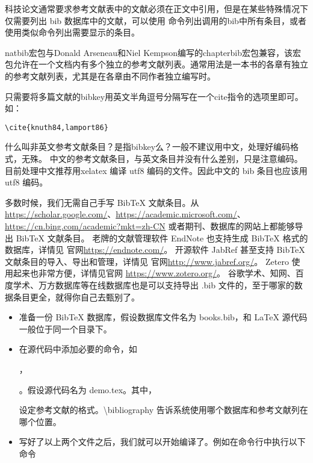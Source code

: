 科技论文通常要求参考文献表中的文献必须在正文中引用，但是在某些特殊情况下仅需要列出
bib 数据库中的文献，可以使用 \nocite{*}
命令列出调用的bib中所有条目，或者使用类似\nocite{ref1,ref2,ref3}命令列出需要显示的条目。







natbib宏包与Donald Arseneau和Niel
Kempson编写的chapterbib宏包兼容，该宏包允许在一个文档内有多个独立的参考文献列表。通常用法是一本书的各章有独立的参考文献列表，尤其是在各章由不同作者独立编写时。



只需要将多篇文献的bibkey用英文半角逗号分隔写在一个cite指令的选项里即可。如：

\begin{verbatim}
\cite{knuth84,lamport86}
\end{verbatim}



什么叫非英文参考文献条目？是指bibkey么？一般不建议用中文，处理好编码格式，无殊。
中文的参考文献条目，与英文条目并没有什么差别，只是注意编码。目前处理中文推荐用xelatex
编译 utf8 编码的文件。因此中文的 bib 条目也应该用 utf8 编码。



多数时候，我们无需自己手写 BibTeX 文献条目。从
\url{https://scholar.google.com/}、\url{https://academic.microsoft.com/}、
\url{https://cn.bing.com/academic?mkt=zh-CN}
或者期刊、数据库的网站上都能够导出 BibTeX 文献条目。 老牌的文献管理软件
EndNote 也支持生成 BibTeX 格式的数据库，详情见
官网\url{https://endnote.com/}。 开源软件 JabRef 甚至支持 BibTeX
文献条目的导入、导出和管理，详情见 官网\url{http://www.jabref.org/}。
Zetero 使用起来也非常方便，详情见官网 \url{https://www.zotero.org/}。
谷歌学术、知网、百度学术、万方数据库等在线数据库也是可以支持导出 .bib
文件的，至于哪家的数据条目更全，就得你自己去甄别了。



\begin{itemize}

\item
  准备一份 BibTeX 数据库，假设数据库文件名为 books.bib，和 LaTeX
  源代码一般位于同一个目录下。
\item
  在源代码中添加必要的命令，如

  

  ，

  

  。假设源代码名为 demo.tex。其中，


  设定参考文献的格式。\textbackslash{}bibliography
  告诉系统使用哪个数据库和参考文献列在哪个位置。
\item
  写好了以上两个文件之后，我们就可以开始编译了。例如在命令行中执行以下命令
\end{itemize}

